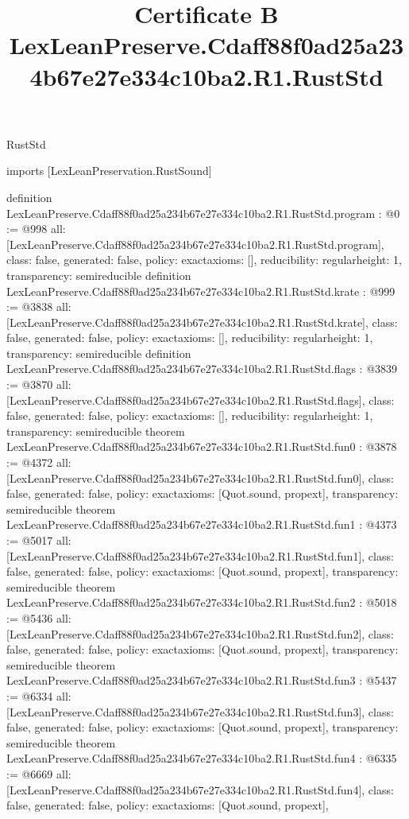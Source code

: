 \begin{lexlean}{RustStd}
\title{Certificate B LexLeanPreserve.Cdaff88f0ad25a234b67e27e334c10ba2.R1.RustStd}
\begin{coremodule}
imports [LexLeanPreservation.RustSound]

definition LexLeanPreserve.Cdaff88f0ad25a234b67e27e334c10ba2.R1.RustStd.program : @0 := @998 {
  all: [LexLeanPreserve.Cdaff88f0ad25a234b67e27e334c10ba2.R1.RustStd.program],
  class: false,
  generated: false,
  policy: exact{axioms: []},
  reducibility: regular{height: 1},
  transparency: semireducible
}
definition LexLeanPreserve.Cdaff88f0ad25a234b67e27e334c10ba2.R1.RustStd.krate : @999 := @3838 {
  all: [LexLeanPreserve.Cdaff88f0ad25a234b67e27e334c10ba2.R1.RustStd.krate],
  class: false,
  generated: false,
  policy: exact{axioms: []},
  reducibility: regular{height: 1},
  transparency: semireducible
}
definition LexLeanPreserve.Cdaff88f0ad25a234b67e27e334c10ba2.R1.RustStd.flags : @3839 := @3870 {
  all: [LexLeanPreserve.Cdaff88f0ad25a234b67e27e334c10ba2.R1.RustStd.flags],
  class: false,
  generated: false,
  policy: exact{axioms: []},
  reducibility: regular{height: 1},
  transparency: semireducible
}
theorem LexLeanPreserve.Cdaff88f0ad25a234b67e27e334c10ba2.R1.RustStd.fun0 : @3878 := @4372 {
  all: [LexLeanPreserve.Cdaff88f0ad25a234b67e27e334c10ba2.R1.RustStd.fun0],
  class: false,
  generated: false,
  policy: exact{axioms: [Quot.sound, propext]},
  transparency: semireducible
}
theorem LexLeanPreserve.Cdaff88f0ad25a234b67e27e334c10ba2.R1.RustStd.fun1 : @4373 := @5017 {
  all: [LexLeanPreserve.Cdaff88f0ad25a234b67e27e334c10ba2.R1.RustStd.fun1],
  class: false,
  generated: false,
  policy: exact{axioms: [Quot.sound, propext]},
  transparency: semireducible
}
theorem LexLeanPreserve.Cdaff88f0ad25a234b67e27e334c10ba2.R1.RustStd.fun2 : @5018 := @5436 {
  all: [LexLeanPreserve.Cdaff88f0ad25a234b67e27e334c10ba2.R1.RustStd.fun2],
  class: false,
  generated: false,
  policy: exact{axioms: [Quot.sound, propext]},
  transparency: semireducible
}
theorem LexLeanPreserve.Cdaff88f0ad25a234b67e27e334c10ba2.R1.RustStd.fun3 : @5437 := @6334 {
  all: [LexLeanPreserve.Cdaff88f0ad25a234b67e27e334c10ba2.R1.RustStd.fun3],
  class: false,
  generated: false,
  policy: exact{axioms: [Quot.sound, propext]},
  transparency: semireducible
}
theorem LexLeanPreserve.Cdaff88f0ad25a234b67e27e334c10ba2.R1.RustStd.fun4 : @6335 := @6669 {
  all: [LexLeanPreserve.Cdaff88f0ad25a234b67e27e334c10ba2.R1.RustStd.fun4],
  class: false,
  generated: false,
  policy: exact{axioms: [Quot.sound, propext]},
}
\end{coremodule}
\end{lexlean}
